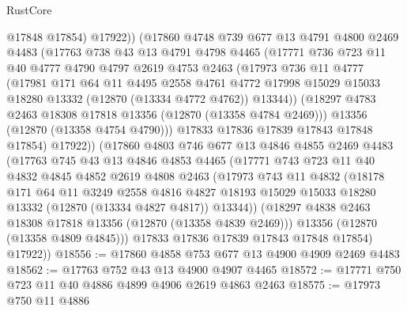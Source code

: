 \begin{lexlean}{RustCore}
\begin{coremodule}
              @17848
              @17854)
            @17922))
        (@17860
          @4748
          @739
          @677
          @13
          @4791
          @4800
          @2469
          @4483
          (@17763
            @738
            @43
            @13
            @4791
            @4798
            @4465
            (@17771
              @736
              @723
              @11
              @40
              @4777
              @4790
              @4797
              @2619
              @4753
              @2463
              (@17973
                @736
                @11
                @4777
                (@17981
                  @171
                  @64
                  @11
                  @4495
                  @2558
                  @4761
                  @4772
                  @17998
                  @15029
                  @15033
                  @18280
                  @13332
                  (@12870 (@13334 @4772 @4762))
                  @13344))
              (@18297 @4783 @2463 @18308 @17818 @13356 (@12870 (@13358 @4784 @2469)))
              @13356
              (@12870 (@13358 @4754 @4790)))
            @17833
            @17836
            @17839
            @17843
            @17848
            @17854)
          @17922))
      (@17860
        @4803
        @746
        @677
        @13
        @4846
        @4855
        @2469
        @4483
        (@17763
          @745
          @43
          @13
          @4846
          @4853
          @4465
          (@17771
            @743
            @723
            @11
            @40
            @4832
            @4845
            @4852
            @2619
            @4808
            @2463
            (@17973
              @743
              @11
              @4832
              (@18178
                @171
                @64
                @11
                @3249
                @2558
                @4816
                @4827
                @18193
                @15029
                @15033
                @18280
                @13332
                (@12870 (@13334 @4827 @4817))
                @13344))
            (@18297 @4838 @2463 @18308 @17818 @13356 (@12870 (@13358 @4839 @2469)))
            @13356
            (@12870 (@13358 @4809 @4845)))
          @17833
          @17836
          @17839
          @17843
          @17848
          @17854)
        @17922))
@18556 := @17860 @4858 @753 @677 @13 @4900 @4909 @2469 @4483
@18562 := @17763 @752 @43 @13 @4900 @4907 @4465
@18572 := @17771 @750 @723 @11 @40 @4886 @4899 @4906 @2619 @4863 @2463
@18575 := @17973 @750 @11 @4886

\end{coremodule}
\end{lexlean}
